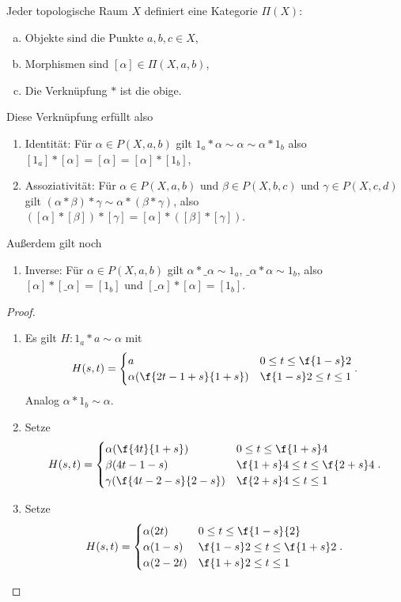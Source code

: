 \begin{st}
	Jeder topologische Raum $X$ definiert eine Kategorie $\Pi(X)$:
	\begin{enumerate}[(a)]
		\item
			Objekte sind die Punkte $a,b,c \in X$,
		\item
			Morphismen sind $[\alpha] \in \Pi(X,a,b)$,
		\item
			Die Verknüpfung $*$ ist die obige.
	\end{enumerate}
	Diese Verknüpfung erfüllt also
	\begin{enumerate}[1)]
		\item
			Identität: Für $\alpha \in P(X,a,b)$ gilt $1_a * \alpha \sim \alpha \sim \alpha * 1_b$
			also $[1_a]*[\alpha] = [\alpha] = [\alpha] * [1_b]$,
		\item
			Assoziativität: Für $\alpha \in P(X,a,b)$ und $\beta \in P(X,b,c)$ und $\gamma \in P(X,c,d)$ gilt $(\alpha*\beta)*\gamma \sim \alpha*(\beta*\gamma)$, also $([\alpha]*[\beta])*[\gamma] = [\alpha] *([\beta]*[\gamma])$.
	\end{enumerate}
	Außerdem gilt noch
	\begin{enumerate}[resume]
		\item
			Inverse: Für $\alpha \in P(X,a,b)$ gilt $\alpha * \_\alpha \sim 1_a$, $\_\alpha * \alpha \sim 1_b$, also $[\alpha]*[\_\alpha] = [1_b]$ und $[\_\alpha] * [\alpha] = [1_b]$.
	\end{enumerate}
	\begin{proof}
		\begin{enumerate}[(1)]
			\item
				Es gilt $H: 1_a * a \sim \alpha$ mit
				\[
					H(s,t) = \begin{cases}
						a & 0 \le t \le \f{1-s}2 \\
						\alpha (\f{2t-1+s}{1+s}) & \f {1-s}2 \le t \le 1
					\end{cases}.
				\]
				Analog $\alpha * 1_b \sim \alpha$.
			\item
				Setze
				\[
					H(s,t) = \begin{cases}
						\alpha(\f{4t}{1+s}) & 0 \le t \le \f{1+s}4 \\
						\beta(4t - 1-s) & \f{1+s}4 \le t \le \f{2+s}4 \\
						\gamma(\f{4t-2-s}{2-s}) & \f{2+s}4 \le t \le 1
					\end{cases}.
				\]
			\item
				Setze
				\[
					H(s,t) = \begin{cases}
						\alpha(2t) & 0 \le t \le \f{1-s}{2} \\
						\alpha(1-s) & \f{1-s}2 \le t \le \f{1+s}2 \\
						\alpha(2-2t)  & \f{1+s}2 \le t \le 1
					\end{cases}.
				\]
		\end{enumerate}
	\end{proof}
\end{st}




